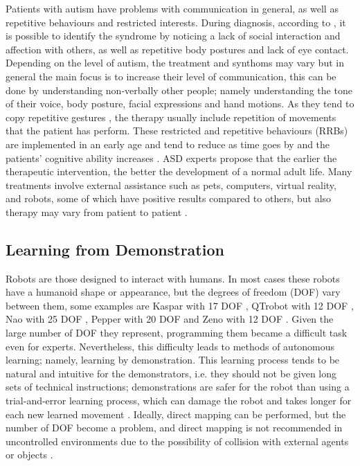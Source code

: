 \documentclass[thesis]{mas_proposal}
\begin{document}
    Patients with autism have problems with communication in general, as well as repetitive behaviours and restricted interests. During diagnosis, according to \cite{Brentani2013}, it is possible to identify the syndrome by noticing a lack of social interaction and affection with others, as well as repetitive body postures and lack of eye contact.  Depending on the level of autism, the treatment and synthoms may vary but in general the main focus is to increase their level of communication, this can be done by understanding non-verbally other people; namely understanding the tone of their voice, body posture, facial expressions and hand motions. As they tend to copy repetitive gestures \cite{Dautenhahn2004}, the therapy usually include repetition of movements that the patient has perform. These restricted and repetitive behaviours (RRBs) are implemented in an early age and tend to reduce as time goes by and the patients' cognitive ability increases \cite{Leekam2011}. ASD experts propose that the earlier the therapeutic intervention, the better the development of a normal adult life. Many treatments involve external assistance such as pets, computers, virtual reality, and robots, some of which have positive results compared to others, but also therapy may vary from patient to patient \cite{Scassellati2012}.
    
    \subsection{Learning from Demonstration}
    
    Robots are those designed to interact with humans. In most cases these robots have a humanoid shape or appearance, but the degrees of freedom (DOF) vary between them, some examples are Kaspar with 17 DOF \cite{Kaspar2023}, QTrobot with 12 DOF \cite{qtrobot_safety_manual}, Nao with 25 DOF \cite{softbankrobotics}, Pepper with 20 DOF \cite{softbankrobotics} and Zeno with 12 DOF \cite{Papakostas2021}. Given the large number of DOF they represent, programming them became a difficult task even for experts. Nevertheless, this difficulty leads to methods of autonomous learning; namely, learning by demonstration. This learning process tends to be natural and intuitive for the demonstrators, i.e. they should not be given long sets of technical instructions; demonstrations are safer for the robot than using a trial-and-error learning process, which can damage the robot and takes longer for each new learned movement \cite{Bandera2012}. Ideally, direct mapping can be performed, but the number of DOF become a problem, and direct mapping is not recommended in uncontrolled environments due to the possibility of collision with external agents or objects \cite{Bentivegna2004}.
    
\end{document}
